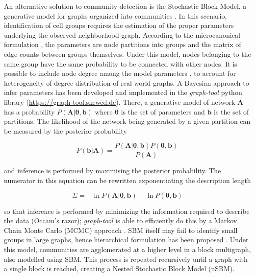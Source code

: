 \documentclass{bmcart}
\begin{document}
An alternative solution to community detection is the Stochastic Block Model, a generative model for graphs organized into communities \cite{holland_1983}. In this scenario, identification of cell groups requires the estimation of the proper parameters underlying the observed neighborhood graph. According to the microcanonical formulation \cite{peixoto_2017}, the parameters are node partitions into groups and the matrix of edge counts between groups themselves. Under this model, nodes belonging to the same group have the same probability to be connected with other nodes. It is possible to include node degree among the model parameters \cite{karrer_2011}, to account for heterogeneity of degree distribution of real-world graphs. A Bayesian approach to infer parameters has been developed \cite{peixoto_2013} and implemented in the \emph{graph-tool} python library (\href{https://graph-tool.skewed.de}{https:/\slash graph-tool.skewed.de}). There, a generative model of network $\boldsymbol A$ has a probability $P(\boldsymbol A|\boldsymbol\theta, \boldsymbol b)$ where \textbf{$\boldsymbol\theta$} is the set of parameters and \textbf{\emph{$\boldsymbol b$}} is the set of partitions. The likelihood of the network being generated by a given partition can be measured by the posterior probability

\begin{equation}
P(\boldsymbol b | \boldsymbol A) = \frac{P(\boldsymbol A|\boldsymbol\theta, \boldsymbol b)P(\boldsymbol\theta, \boldsymbol b)}{P(\boldsymbol A)}
\end{equation}

and inference is performed by maximising the posterior probability. The numerator in this equation can be rewritten exponentiating the description length

\begin{equation}
\Sigma = -\ln P(\boldsymbol A|\boldsymbol\theta, \boldsymbol b) - \ln P(\boldsymbol\theta, \boldsymbol b)
\end{equation}

so that inference is performed by minimizing the information required to describe the data (Occam's razor); \emph{graph-tool} is able to efficiently do this by a Markov Chain Monte Carlo (MCMC) approach \cite{peixoto_2014}. SBM itself may fail to identify small groups in large graphs, hence hierarchical formulation has been proposed \cite{peixoto_2014_h}. Under this model, communities are agglomerated at a higher level in a block multigraph, also modelled using SBM. This process is repeated recursively until a graph with a single block is reached, creating a Nested Stochastic Block Model (nSBM).
\end{document}
